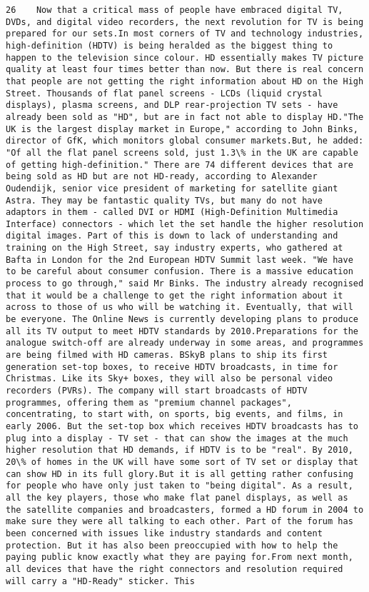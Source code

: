 \documentclass[11pt]{article}
\begin{document}
\begin{Verbatim}[commandchars=\\\{\}]
         26    Now that a critical mass of people have embraced digital TV, DVDs, and digital video recorders, the next revolution for TV is being prepared for our sets.In most corners of TV and technology industries, high-definition (HDTV) is being heralded as the biggest thing to happen to the television since colour. HD essentially makes TV picture quality at least four times better than now. But there is real concern that people are not getting the right information about HD on the High Street. Thousands of flat panel screens - LCDs (liquid crystal displays), plasma screens, and DLP rear-projection TV sets - have already been sold as "HD", but are in fact not able to display HD."The UK is the largest display market in Europe," according to John Binks, director of GfK, which monitors global consumer markets.But, he added: "Of all the flat panel screens sold, just 1.3\% in the UK are capable of getting high-definition." There are 74 different devices that are being sold as HD but are not HD-ready, according to Alexander Oudendijk, senior vice president of marketing for satellite giant Astra. They may be fantastic quality TVs, but many do not have adaptors in them - called DVI or HDMI (High-Definition Multimedia Interface) connectors - which let the set handle the higher resolution digital images. Part of this is down to lack of understanding and training on the High Street, say industry experts, who gathered at Bafta in London for the 2nd European HDTV Summit last week. "We have to be careful about consumer confusion. There is a massive education process to go through," said Mr Binks. The industry already recognised that it would be a challenge to get the right information about it across to those of us who will be watching it. Eventually, that will be everyone. The Online News is currently developing plans to produce all its TV output to meet HDTV standards by 2010.Preparations for the analogue switch-off are already underway in some areas, and programmes are being filmed with HD cameras. BSkyB plans to ship its first generation set-top boxes, to receive HDTV broadcasts, in time for Christmas. Like its Sky+ boxes, they will also be personal video recorders (PVRs). The company will start broadcasts of HDTV programmes, offering them as "premium channel packages", concentrating, to start with, on sports, big events, and films, in early 2006. But the set-top box which receives HDTV broadcasts has to plug into a display - TV set - that can show the images at the much higher resolution that HD demands, if HDTV is to be "real". By 2010, 20\% of homes in the UK will have some sort of TV set or display that can show HD in its full glory.But it is all getting rather confusing for people who have only just taken to "being digital". As a result, all the key players, those who make flat panel displays, as well as the satellite companies and broadcasters, formed a HD forum in 2004 to make sure they were all talking to each other. Part of the forum has been concerned with issues like industry standards and content protection. But it has also been preoccupied with how to help the paying public know exactly what they are paying for.From next month, all devices that have the right connectors and resolution required will carry a "HD-Ready" sticker. This 
\end{Verbatim}
\end{document}
